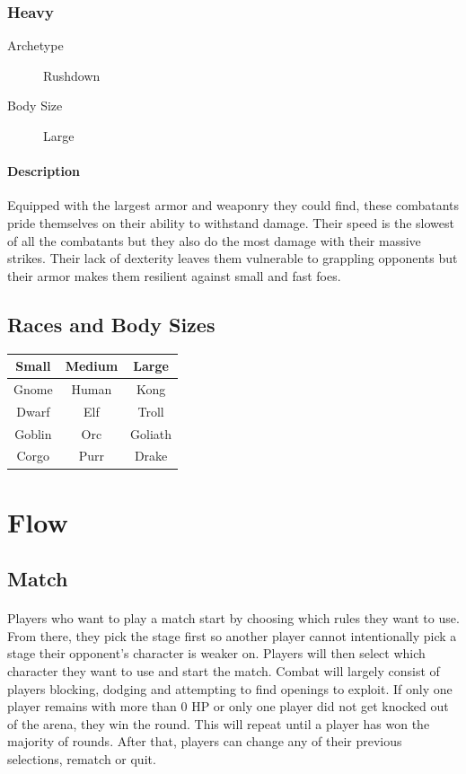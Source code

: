\subsubsection{Heavy}

\begin{description}
    \item[Archetype] Rushdown
    \item[Body Size] Large
\end{description}

\paragraph{Description} Equipped with the largest armor and weaponry they could find, these combatants pride themselves on their ability to withstand damage. Their speed is the slowest of all the combatants but they also do the most damage with their massive strikes. Their lack of dexterity leaves them vulnerable to grappling opponents but their armor makes them resilient against small and fast foes.

\subsection{Races and Body Sizes}

\begin{table}[h!]
    \centering
    \begin{tabular}{c|c|c}
    Small  & Medium & Large   \\
    \hline
    Gnome  & Human  & Kong    \\
    Dwarf  & Elf    & Troll   \\
    Goblin & Orc    & Goliath \\
    Corgo  & Purr   & Drake  
    \end{tabular}
\end{table}

\section{Flow}

\subsection{Match}

\paragraph{} Players who want to play a match start by choosing which rules they want to use. From there, they pick the stage first so another player cannot intentionally pick a stage their opponent's character is weaker on. Players will then select which character they want to use and start the match. Combat will largely consist of players blocking, dodging and attempting to find openings to exploit. If only one player remains with more than 0 HP or only one player did not get knocked out of the arena, they win the round. This will repeat until a player has won the majority of rounds. After that, players can change any of their previous selections, rematch or quit.

